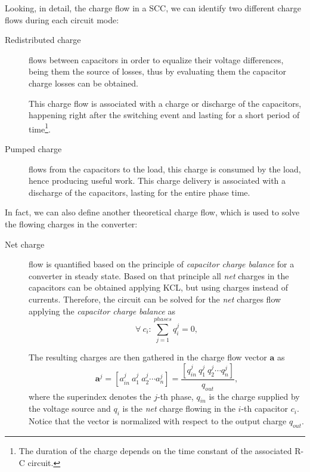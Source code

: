 Looking, in detail, the charge flow in a SCC, we can identify two different charge flows during each circuit mode:
\begin{description}

  \item[Redistributed charge] flows between capacitors in order to equalize their voltage differences, being them the source of losses, thus by evaluating them the capacitor charge losses can be obtained.

      This charge flow is associated with a charge or discharge of the capacitors, happening right after the switching event and lasting for a short period of time\footnote{The duration of the charge depends on the time constant of the associated R-C circuit.}.

  \item[Pumped charge] flows from the capacitors to the load, this charge is consumed by the load, hence producing useful work.  This charge delivery is associated with a discharge of the capacitors, lasting for the entire phase time.

\end{description}

In fact, we can also define another theoretical charge flow, which is used to solve the flowing charges in the converter:
\begin{description}

  \item[Net charge] flow is quantified based on the principle of \emph{capacitor charge balance} for a converter in steady state. Based on that principle all \emph{net} charges in the capacitors can be obtained applying KCL, but using charges instead of currents. Therefore, the circuit can be solved for the \emph{net} charges flow applying
      the \emph{capacitor charge balance} as
      \begin{equation}
       \forall~c_{i} : \sum_{j=1}^{phases}q_{i}^j = 0,
      \label{eq:charge_balance}
      \end{equation}

     The resulting charges are then gathered in the charge flow vector $\mathbf{a}$ as
       \begin{equation}
        \mathbf{a}^j =  \left[ a_{in}^j~a_1^j~a_2^j \cdots a_n^j \right] = \frac{\left[ q_{in}^j~q_1^j~q_2^j \cdots q_n^j \right]}{q_{out}},
      \label{eq:a_vector}
      \end{equation}
    where the superindex denotes the $j$-th phase, $q_{in}$ is the charge supplied by the voltage source and $q_i$ is the \emph{net} charge flowing in the $i$-th capacitor $c_i$. Notice that the vector is normalized with respect to the output charge $q_{out}$.



\end{description}


